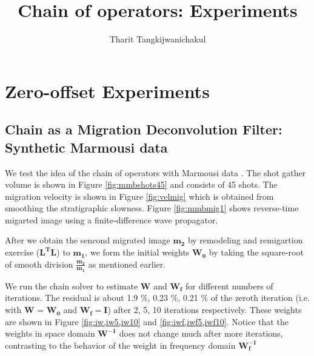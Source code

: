 \title{Chain of operators: Experiments}
\renewcommand{\thefootnote}{\fnsymbol{footnote}}
\relax{}
\author{Tharit Tangkijwanichakul}
\label{ch:chapter-lsrtm}

\maketitle

\section{Zero-offset Experiments}

\subsection{Chain as a Migration Deconvolution Filter: Synthetic Marmousi data}
%

We test the idea of the chain of operators with Marmousi data \cite[]{versteeg1994}. The shot gather volume is shown in Figure \ref{fig:mmbshots45} and consists of 45 shots. The migration velocity is shown in Figure \ref{fig:velmig} which is obtained from smoothing the stratigraphic slowness. Figure \ref{fig:mmbmig1} shows reverse-time migarted image using a finite-difference wave propagator. 



%

After we obtain the sencond migrated image $\mathbf{m_2}$ by remodeling and remigartion exercise ($\mathbf{L^{T}L}$) to $\mathbf{m_1}$, we form the initial weights $\mathbf{W_0}$ by taking the square-root of smooth division $\mathbf{\frac{m_2}{m_1}}$ as mentioned earlier.

We run the chain solver to estimate $\mathbf{W}$ and $\mathbf{W_f}$ for different numbers of iterations. The residual is about 1.9 $\%$, 0.23 $\%$, 0.21 $\%$ of the zeroth iteration (i.e. with $\mathbf{W}$ = $\mathbf{W_0}$ and $\mathbf{W_f} = \mathbf{I}$) after 2, 5, 10 iterations respectively. These weights are shown in Figure \ref{fig:iw,iw5,iw10} and \ref{fig:iwf,iwf5,iwf10}. Notice that the weights in space domain $\mathbf{W^{-1}}$ does not change much after more iterations, contrasting to the behavior of the weight in frequency domain $\mathbf{W_f^{-1}}$

